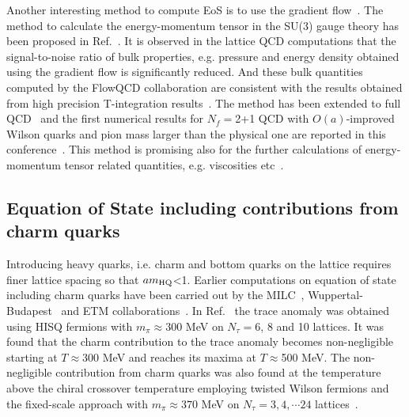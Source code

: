 \documentclass{PoS}
\begin{document}
Another interesting method to compute EoS is to use the gradient flow~\cite{Luscher:2010iy,Luscher:2011bx,Luscher:2013vga}. The method to calculate the energy-momentum tensor in the SU(3) gauge theory has been proposed in Ref.~\cite{Suzuki:2013gza}. It is observed in the lattice QCD computations that the signal-to-noise ratio of bulk properties, e.g. pressure and energy density obtained using the gradient flow 
is significantly reduced. And these bulk quantities computed by the FlowQCD collaboration are consistent with the results obtained from high precision T-integration results~\cite{Asakawa:2013laa,Kitazawa:2016dsl}. The method has been extended to full QCD~\cite{Makino:2014taa} and the first numerical results for $N_f=$2+1 QCD with $O(a)$-improved Wilson quarks and pion mass larger than the physical one are reported in this conference~\cite{Taniguchi:2016ofw,Kanaya:2016rkt}.  
This method is promising also for the further calculations of energy-momentum tensor related quantities, e.g. viscosities etc~\cite{Suzuki:2016ytc}.





\subsection{Equation of State including contributions from charm quarks}
\label{sec:EoScharm}

Introducing heavy quarks, i.e. charm and bottom quarks on the lattice requires finer lattice spacing so that $a m_{\rm HQ}$<1.
Earlier computations on equation of state including charm quarks have been carried out by the MILC~\cite{Bazavov:2012kf,Bazavov:2013pra}, Wuppertal-Budapest~\cite{Ratti:2013uta} and ETM collaborations~\cite{Burger:2015xda}. In Ref.~\cite{Bazavov:2013pra} the trace anomaly was obtained using HISQ fermions with $m_\pi\approx$300 MeV on $N_\tau=6$, 8 and 10 lattices. It was found that the charm contribution to the trace anomaly becomes non-negligible starting at $T\approx$300 MeV and reaches its maxima at $T\approx$500 MeV.  The non-negligible contribution from charm quarks was also found at the temperature above the chiral crossover temperature employing twisted Wilson fermions and the fixed-scale approach with $m_\pi\approx370$ MeV on $N_\tau=3,4,\cdots24$ lattices~\cite{Burger:2015xda}.
\end{document}
